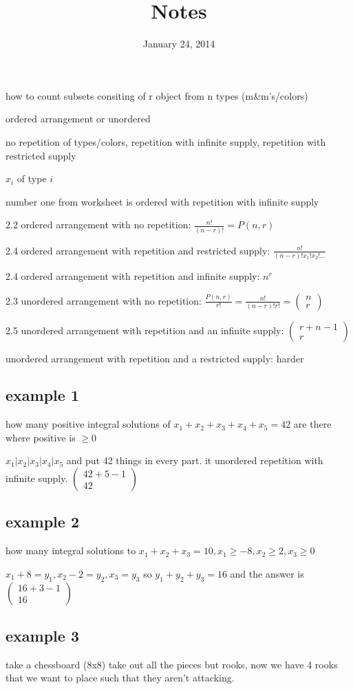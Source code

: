 \documentclass{article}
\begin{document}
\title{Notes}
\date{January 24, 2014}
\maketitle
how to count subsets consiting of r object from n types (m\&m's/colors)

ordered arrangement or unordered

no repetition of types/colors, repetition with infinite supply, repetition with restricted supply

$x_i$ of type $i$

number one from worksheet is ordered with repetition with infinite supply

2.2 ordered arrangement with no repetition: $\frac{n!}{(n-r)!}=P(n,r)$

2.4 ordered arrangement with repetition and restricted supply: $\frac{n!}{(n-r)!x_1!x_2!...}$

2.4 ordered arrangement with repetition and infinite supply: $n^r$

2.3 unordered arrangement with no repetition: $\frac{P(n,r)}{r!}=\frac{n!}{(n-r)!r!}=\left(\begin{array}{c}n\\r\end{array}\right)$

2.5 unordered arrangement with repetition and an infinite supply: $\left(\begin{array}{c}r+n-1\\r\end{array}\right)$

unordered arrangement with repetition and a restricted supply: harder

\subsection*{example 1}
how many positive integral solutions of $x_1+x_2+x_3+x_4+x_5=42$ are there where positive is $\geq0$

$x_1|x_2|x_3|x_4|x_5$ and put 42 things in every part. it unordered repetition with infinite supply. $\left(\begin{array}{c}42+5-1\\42\end{array}\right)$

\subsection*{example 2}
how  many integral solutions to $x_1+x_2+x_3=10, x_1\geq-8, x_2\geq2, x_3\geq0$

$x_1+8=y_1, x_2-2=y_2, x_3=y_3$ so $y_1+y_2+y_3=16$ and the answer is $\left(\begin{array}{c}16+3-1\\16\end{array}\right)$

\subsection*{example 3}
take a chessboard (8x8) take out all the pieces but rooks, now we have 4 rooks that we want to place such that they aren't attacking.
\end{document}
